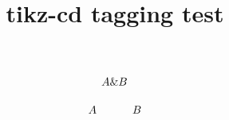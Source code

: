 \documentclass{article}
\title{tikz-cd tagging test}
\begin{document}
\[\begin{tikzcd}
  A \& B
\end{tikzcd}\]

\[\begin{tikzcd}[ampersand replacement=\&,]
  A \& B
\end{tikzcd}\]
\end{document}
